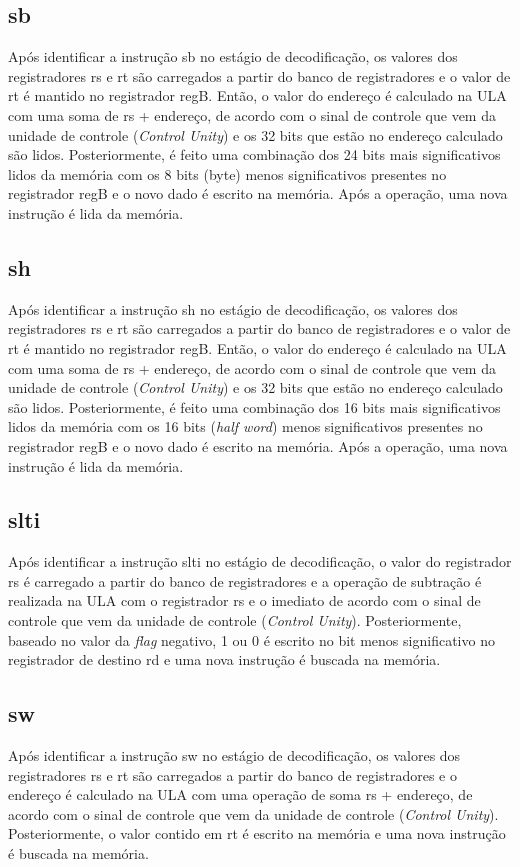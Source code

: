 \documentclass{article}
\begin{document}
    \subsection{sb}
    Após identificar a instrução sb no estágio de decodificação, os valores dos registradores rs e rt são carregados a partir do banco de registradores e o valor de rt é mantido no registrador regB. Então, o valor do endereço é calculado na ULA com uma soma de rs + endereço, de acordo com o sinal de controle que vem da unidade de controle ({\it Control Unity}) e os 32 bits que estão no endereço calculado são lidos. Posteriormente, é feito uma combinação dos 24 bits mais significativos lidos da memória com os 8 bits (byte) menos significativos presentes no registrador regB e o novo dado é escrito na memória. Após a operação, uma nova instrução é lida da memória.
    \\
    \subsection{sh}
    Após identificar a instrução sh no estágio de decodificação, os valores dos registradores rs e rt são carregados a partir do banco de registradores e o valor de rt é mantido no registrador regB. Então, o valor do endereço é calculado na ULA com uma soma de rs + endereço, de acordo com o sinal de controle que vem da unidade de controle ({\it Control Unity}) e os 32 bits que estão no endereço calculado são lidos. Posteriormente, é feito uma combinação dos 16 bits mais significativos lidos da memória com os 16 bits ({\it half word}) menos significativos presentes no registrador regB e o novo dado é escrito na memória. Após a operação, uma nova instrução é lida da memória.
    \\
    \subsection{slti}
    Após identificar a instrução slti no estágio de decodificação, o valor do registrador rs é carregado a partir do banco de registradores e a operação de subtração é realizada na ULA com o registrador rs e o imediato de acordo com o sinal de controle que vem da unidade de controle ({\it Control Unity}). Posteriormente, baseado no valor da {\it flag} negativo, 1 ou 0 é escrito no bit menos significativo no registrador de destino rd e uma nova instrução é buscada na memória.
    \\
    \subsection{sw}
    Após identificar a instrução sw no estágio de decodificação, os valores dos registradores rs e rt são carregados a partir do banco de registradores e o endereço é calculado na ULA com uma operação de soma rs + endereço, de acordo com o sinal de controle que vem da unidade de controle ({\it Control Unity}). Posteriormente, o valor contido em rt é escrito na memória e uma nova instrução é buscada na memória.
    
\end{document}
